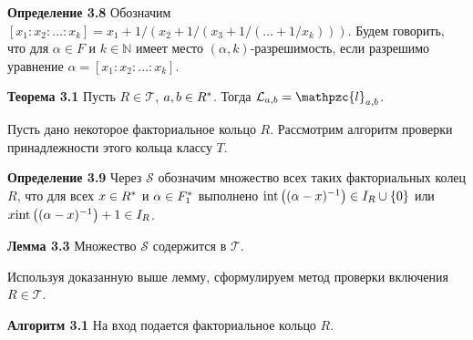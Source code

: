 \documentclass[_00_autoref.tex]{subfiles}
\begin{document}
\textbf{Определение 3.8}
    Обозначим $[x_1: x_2: \dots: x_k] = x_{1} + 1/(x_{2} + 1/(x_{3} + 1/(\dots + 1/x_k)))$.
    Будем говорить, что для $\alpha \in F$ и $k \in \mathbb{N}$ имеет место $(\alpha, k)$-разрешимость, если разрешимо уравнение $\alpha = [x_1: x_2: \dots: x_k]$.

\textbf{Теорема 3.1}\label{theorem:Kroneker_Vahlen_theorem_in_UFD}
    Пусть $R \in \mathcal{T}$, $a, b \in R^{*}$.
    Тогда $\mathcal{L}_{a, b} = \mathpzc{l}_{a, b}$.


Пусть дано некоторое факториальное кольцо $R$.
Рассмотрим алгоритм проверки принадлежности этого кольца классу $T$.

\textbf{Определение 3.9}
    Через $\mathcal{S}$ обозначим множество всех таких факториальных колец $R$, что для всех $x \in R^{*}$ и $\alpha \in F_1^{*}$ выполнено $\textrm{int}\left((\alpha - x)^{-1}\right) \in I_{R} \cup \{0\}$ или $x \textrm{int}\left((\alpha - x)^{-1}\right) + 1 \in I_{R}$.

\textbf{Лемма 3.3}
    Множество $\mathcal{S}$ содержится в $\mathcal{T}$.

Используя доказанную выше лемму, сформулируем метод проверки включения $R \in \mathcal{T}$.

\textbf{Алгоритм 3.1}\label{algorithm:R_in_S}
    На вход подается факториальное кольцо $R$.
    
\end{document}
